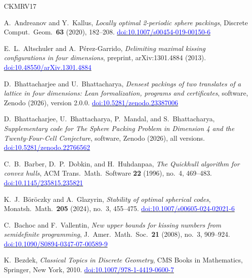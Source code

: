 \documentclass[11pt,reqno]{amsart}
\newcommand{\bluelink}[2]{\href{#1}{\textcolor{blue}{#2}}}
\renewcommand{\_}{\origunderscore\allowbreak}
\numberwithin{equation}{section}
\theoremstyle{plain}
\theoremstyle{definition}
\theoremstyle{remark}
\begin{document}
\begin{thebibliography}{CKMRV17}
\setlength{\itemsep}{-1.3pt}

A.~Andreanov and Y.~Kallus,
\textit{Locally optimal 2-periodic sphere packings},
Discrete Comput.\ Geom.\ \textbf{63} (2020), 182--208.
\bluelink{https://doi.org/10.1007/s00454-019-00150-6}{doi:10.1007/s00454-019-00150-6}

E.~L.~Altschuler and A.~P\'erez-Garrido,
\textit{Delimiting maximal kissing configurations in four dimensions},
preprint, arXiv:1301.4884 (2013).
\bluelink{https://doi.org/10.48550/arXiv.1301.4884}{doi:10.48550/arXiv.1301.4884}

D.~Bhattacharjee and U.~Bhattacharya,
\textit{Densest packings of two translates of a lattice in four dimensions:
Lean formalization, programs and certificates}, software, Zenodo (2026),
version 2.0.0.
\bluelink{https://doi.org/10.5281/zenodo.23387006}{doi:10.5281/zenodo.23387006}

D.~Bhattacharjee, U.~Bhattacharya, P.~Mandal, and S.~Bhattacharya,
\textit{Supplementary code for The Sphere Packing Problem in Dimension 4 and
the Twenty-Four-Cell Conjecture}, software, Zenodo (2026), all versions.
\bluelink{https://doi.org/10.5281/zenodo.22766562}{doi:10.5281/zenodo.22766562}

C.~B.~Barber, D.~P.~Dobkin, and H.~Huhdanpaa,
\textit{The Quickhull algorithm for convex hulls},
ACM Trans.\ Math.\ Software \textbf{22} (1996), no.~4, 469--483.
\bluelink{https://doi.org/10.1145/235815.235821}{doi:10.1145/235815.235821}

K.~J.~B\"or\"oczky and A.~Glazyrin, \textit{Stability of optimal spherical
codes}, Monatsh.\ Math.\ \textbf{205} (2024), no.~3, 455--475.
\bluelink{https://doi.org/10.1007/s00605-024-02021-6}{doi:10.1007/s00605-024-02021-6}

C.~Bachoc and F.~Vallentin,
\textit{New upper bounds for kissing numbers from semidefinite programming},
J.\ Amer.\ Math.\ Soc.\ \textbf{21} (2008), no.~3, 909--924.
\bluelink{https://doi.org/10.1090/S0894-0347-07-00589-9}{doi:10.1090/S0894-0347-07-00589-9}

K.~Bezdek,
\textit{Classical Topics in Discrete Geometry},
CMS Books in Mathematics, Springer, New York, 2010.
\bluelink{https://doi.org/10.1007/978-1-4419-0600-7}{doi:10.1007/978-1-4419-0600-7}


\end{thebibliography}
\end{document}
